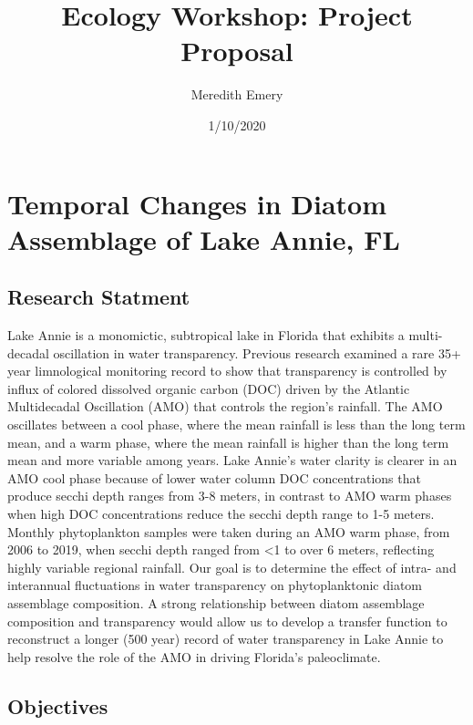 \documentclass[
]{article}
\title{Ecology Workshop: Project Proposal}
\author{Meredith Emery}
\date{1/10/2020}
\begin{document}
\maketitle

\hypertarget{temporal-changes-in-diatom-assemblage-of-lake-annie-fl}{%
\section{\texorpdfstring{\center \textbf{Temporal Changes in Diatom
Assemblage of Lake Annie, FL}
\center}{Temporal Changes in Diatom Assemblage of Lake Annie, FL }}\label{temporal-changes-in-diatom-assemblage-of-lake-annie-fl}}

\hypertarget{research-statment}{%
\subsection{Research Statment}\label{research-statment}}

Lake Annie is a monomictic, subtropical lake in Florida that exhibits a
multi-decadal oscillation in water transparency. Previous research
examined a rare 35+ year limnological monitoring record to show that
transparency is controlled by influx of colored dissolved organic carbon
(DOC) driven by the Atlantic Multidecadal Oscillation (AMO) that
controls the region's rainfall. The AMO oscillates between a cool phase,
where the mean rainfall is less than the long term mean, and a warm
phase, where the mean rainfall is higher than the long term mean and
more variable among years. Lake Annie's water clarity is clearer in an
AMO cool phase because of lower water column DOC concentrations that
produce secchi depth ranges from 3-8 meters, in contrast to AMO warm
phases when high DOC concentrations reduce the secchi depth range to 1-5
meters. Monthly phytoplankton samples were taken during an AMO warm
phase, from 2006 to 2019, when secchi depth ranged from \textless{}1 to
over 6 meters, reflecting highly variable regional rainfall. Our goal is
to determine the effect of intra- and interannual fluctuations in water
transparency on phytoplanktonic diatom assemblage composition. A strong
relationship between diatom assemblage composition and transparency
would allow us to develop a transfer function to reconstruct a longer
(500 year) record of water transparency in Lake Annie to help resolve
the role of the AMO in driving Florida's paleoclimate.

\hypertarget{objectives}{%
\subsection{Objectives}\label{objectives}}
\end{document}
